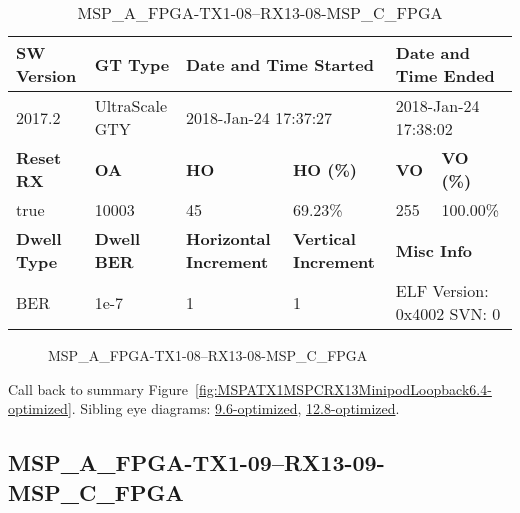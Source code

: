 \begin{table}[h]
\centering
\caption{MSP\_A\_FPGA-TX1-08--RX13-08-MSP\_C\_FPGA}
\label{tab:MSPAFPGATX108RX1308MSPCFPGA6.4-optimized}
\begin{tabular}{@{}|l|l|l|l|l|l|@{}}
\toprule
\textbf{SW Version}                & \textbf{GT Type}   & \multicolumn{2}{l|}{\textbf{Date and Time Started}}            & \multicolumn{2}{l|}{\textbf{Date and Time Ended}}        \\ \midrule
2017.2                       & UltraScale GTY          & \multicolumn{2}{l|}{2018-Jan-24 17:37:27}                   & \multicolumn{2}{l|}{2018-Jan-24 17:38:02}               \\ \midrule
\textbf{Reset RX}                  & \textbf{OA} & \textbf{HO}   & \textbf{HO (\%)} & \textbf{VO} & \textbf{VO (\%)} \\ \midrule
true & 10003        & 45          & 69.23\%        & 255        & 100.00\%       \\ \midrule
\textbf{Dwell Type}                & \textbf{Dwell BER} & \textbf{Horizontal Increment} & \textbf{Vertical Increment}    & \multicolumn{2}{l|}{\textbf{Misc Info}}                  \\ \midrule
BER                            & 1e-7        & 1        & 1           & \multicolumn{2}{l|}{ELF Version: 0x4002 SVN: 0}                         \\ \bottomrule
\end{tabular}
\end{table}

\begin{figure}[h]
\caption{MSP\_A\_FPGA-TX1-08--RX13-08-MSP\_C\_FPGA} \label{fig:MSPAFPGATX108RX1308MSPCFPGA6.4-optimized}
\end{figure}

Call back to summary Figure~\ref{fig:MSPATX1MSPCRX13MinipodLoopback6.4-optimized}.
Sibling eye diagrams: \hyperref[sec:MSPAFPGATX108RX1308MSPCFPGA9.6-optimized]{9.6-optimized}, \hyperref[sec:MSPAFPGATX108RX1308MSPCFPGA12.8-optimized]{12.8-optimized}.

\clearpage
\newpage


\subsection{MSP\_A\_FPGA-TX1-09--RX13-09-MSP\_C\_FPGA}\label{sec:MSPAFPGATX109RX1309MSPCFPGA6.4-optimized}

